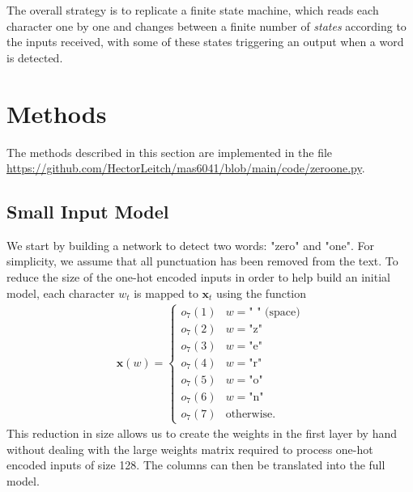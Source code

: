\documentclass{somasmsc}
\begin{document}
The overall strategy is to replicate a finite state machine, which reads each character one by one and changes between a finite number of \textit{states} according to the inputs received, with some of these states triggering an output when a word is detected.

\section{Methods}

The methods described in this section are implemented in the file \url{https://github.com/HectorLeitch/mas6041/blob/main/code/zeroone.py}.

\subsection{Small Input Model}\label{zeroone:small}

We start by building a network to detect two words: "zero" and "one". For simplicity, we assume that all punctuation has been removed from the text. To reduce the size of the one-hot encoded inputs in order to help build an initial model, each character $w_t$ is mapped to $\pmb{x}_t$ using the function
\begin{align*}
    \mathbf{x}\left(w\right) =
    \begin{cases}
        o_7(1) & w = \text{" " (space)} \\
        o_7(2) & w = \text{"z"} \\
        o_7(3) & w = \text{"e"} \\
        o_7(4) & w = \text{"r"} \\
        o_7(5) & w = \text{"o"} \\
        o_7(6) & w = \text{"n"} \\
        o_7(7) & \text{otherwise}.
    \end{cases}
\end{align*}
This reduction in size allows us to create the weights in the first layer by hand without dealing with the large weights matrix required to process one-hot encoded inputs of size 128. The columns can then be translated into the full model.
\end{document}
